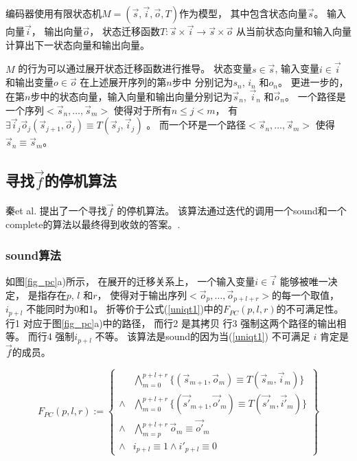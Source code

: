 编码器使用有限状态机$M=(\vec{s},\vec{i},\vec{o},T)$作为模型，
其中包含状态向量$\vec{s}$。
输入向量$\vec{i}$，
输出向量$\vec{o}$，
状态迁移函数$T: \vec{s}\times \vec{i}\to \vec{s}\times \vec{o}$
从当前状态向量和输入向量计算出下一状态向量和输出向量。

$M$ 的行为可以通过展开状态迁移函数进行推导。
状态变量$s\in\vec{s}$, 输入变量$i\in\vec{i}$ 和输出变量$o\in\vec{o}$ 在上述展开序列的第$n$步中
分别记为$s_n$, $i_n$ 和$o_n$。
更进一步的，
在第$n$步中的状态向量，输入向量和输出向量分别记为$\vec{s}_n$, $\vec{i}_n$ 和$\vec{o}_n$。
一个路径是一个序列$<\vec{s}_n,\dots,\vec{s}_m>$ 使得对于所有$n\le j< m$，
有$\exists \vec{i}_j\vec{o}_j (\vec{s}_{j+1},\vec{o}_j)\equiv T(\vec{s}_j,\vec{i}_j)$ 。
而一个环是一个路径$<\vec{s}_n,\dots,\vec{s}_m>$ 使得$\vec{s}_n\equiv \vec{s}_m$。



\subsection{寻找$\vec{f}$的停机算法}\label{subsec_chkextdec}


秦et al. \cite{QinTODAES15} 提出了一个寻找$\vec{f}$ 的停机算法。
该算法通过迭代的调用一个sound和一个complete的算法以最终得到收敛的答案。.

\subsubsection{sound算法}\label{subsub_sound}
如图\ref{fig_pc}a)所示，
在展开的迁移关系上，
一个输入变量$i\in\vec{i}$ 能够被唯一决定，
是指存在$p$, $l$ 和$r$，
使得对于输出序列$<\vec{o}_p,\dots,\vec{o}_{p+l+r}>$的每一个取值，
$i_{p+l}$ 不能同时为0和1。
折等价于公式(\ref{uniqt1})中的$F_{PC}(p,l,r)$的不可满足性。
行1 对应于图\ref{fig_pc}a)中的路径，
而行2 是其拷贝
行3 强制这两个路径的输出相等。
而行4 强制$i_{p+l}$ 不等。
该算法是sound的因为当(\ref{uniqt1}) 不可满足
$i$ 肯定是$\vec{f}$的成员。

\begin{equation}\label{uniqt1}
F_{PC}(p,l,r):=
\left\{
\begin{array}{cc}
&\bigwedge_{m=0}^{p+l+r}
\{
(\vec{s}_{m+1},\vec{o}_m)\equiv T(\vec{s}_m,\vec{i}_m)
\}
\\
\wedge&\bigwedge_{m=0}^{p+l+r}
\{
(\vec{s'}_{m+1},\vec{o'}_m)\equiv T(\vec{s'}_m,\vec{i'}_m)
\}
\\
\wedge&\bigwedge_{m=p}^{p+l+r}\vec{o}_m\equiv \vec{o'}_m \\
\wedge& i_{p+l}\equiv 1 \wedge  i'_{p+l}\equiv 0
\end{array}
\right\}
\end{equation}


